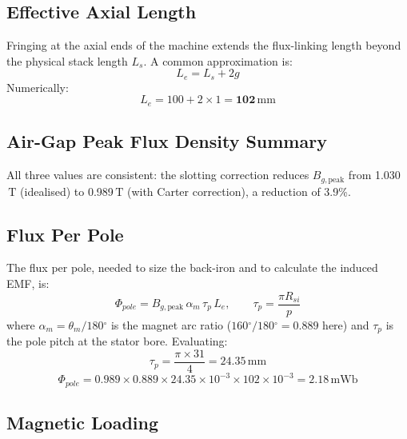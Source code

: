 \documentclass[12pt,a4paper]{article}
\newcommand{\unit}[1]{\ensuremath{\,\mathrm{#1}}}
\newcommand{\degree}{\ensuremath{^{\circ}}}
\begin{document}
\subsection{Effective Axial Length}

Fringing at the axial ends of the machine extends the flux-linking length
beyond the physical stack length $L_s$.
A common approximation is:
\begin{equation}
  L_e = L_s + 2g
  \label{eq:Le}
\end{equation}
Numerically:
\begin{equation}
  L_e = 100 + 2 \times 1 = \mathbf{102\unit{mm}}
\end{equation}

\subsection{Air-Gap Peak Flux Density Summary}

All three values are consistent: the slotting correction reduces
$B_{g,\text{peak}}$ from 1.030\unit{T} (idealised) to 0.989\unit{T}
(with Carter correction), a reduction of 3.9\%.

\subsection{Flux Per Pole}

The flux per pole, needed to size the back-iron and to calculate the
induced EMF, is:
\begin{equation}
  \Phi_{pole} = B_{g,\text{peak}}\,\alpha_m\,\tau_p\,L_e,
  \qquad
  \tau_p = \frac{\pi R_{si}}{p}
  \label{eq:Phi}
\end{equation}
where $\alpha_m = \theta_m/180\degree$ is the magnet arc ratio
($160\degree/180\degree = 0.889$ here) and $\tau_p$ is the pole pitch at
the stator bore.
Evaluating:
\begin{equation}
  \tau_p = \frac{\pi \times 31}{4} = 24.35\unit{mm}
\end{equation}
\begin{equation}
  \Phi_{pole} = 0.989 \times 0.889 \times 24.35\times10^{-3}
                \times 102\times10^{-3}
              = \mathbf{2.18\unit{mWb}}
\end{equation}

\subsection{Magnetic Loading}
\end{document}

